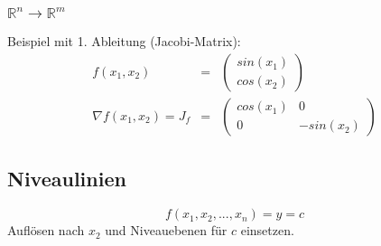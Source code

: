 \subsubsection{$\mathbb{R}^n \rightarrow \mathbb{R}^m$}
\label{ssub:rnrm}
Beispiel mit 1. Ableitung (Jacobi-Matrix): 
\begin{eqnarray*}
	f(x_1,x_2) &=& \left(\begin{array}{c} sin(x_1) \\ cos(x_2)\end{array}\right) \\
	\nabla f(x_1,x_2) = J_f &=& \left( \begin{array}{cc} cos(x_1) & 0 \\ 0 & -sin(x_2) \end{array} \right)
\end{eqnarray*}	

\subsection{Niveaulinien}
\label{sub:niveaulinien}

\begin{equation}
	f(x_1,x_2,...,x_n) = y = c
\end{equation}
Auflösen nach $x_2$ und Niveauebenen für $c$ einsetzen.

